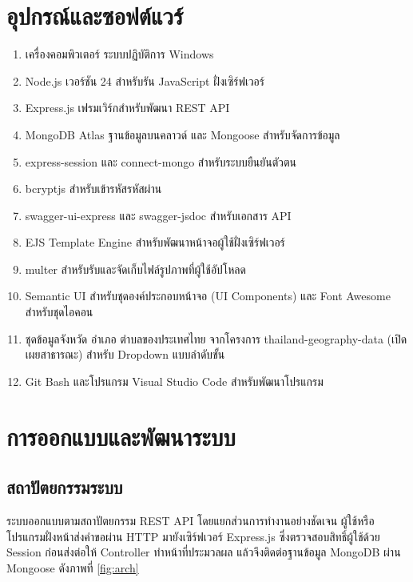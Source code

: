 \documentclass[12pt,a4paper]{report}
\begin{document}
\section{อุปกรณ์และซอฟต์แวร์}

\begin{enumerate}[label=\arabic*., leftmargin=2.5em, itemsep=0.2em]
  \item เครื่องคอมพิวเตอร์ ระบบปฏิบัติการ Windows
  \item Node.js เวอร์ชัน 24 สำหรับรัน JavaScript ฝั่งเซิร์ฟเวอร์
  \item Express.js เฟรมเวิร์กสำหรับพัฒนา REST API
  \item MongoDB Atlas ฐานข้อมูลบนคลาวด์ และ Mongoose สำหรับจัดการข้อมูล
  \item express-session และ connect-mongo สำหรับระบบยืนยันตัวตน
  \item bcryptjs สำหรับเข้ารหัสรหัสผ่าน
  \item swagger-ui-express และ swagger-jsdoc สำหรับเอกสาร API
  \item EJS Template Engine สำหรับพัฒนาหน้าจอผู้ใช้ฝั่งเซิร์ฟเวอร์
  \item multer สำหรับรับและจัดเก็บไฟล์รูปภาพที่ผู้ใช้อัปโหลด
  \item Semantic UI สำหรับชุดองค์ประกอบหน้าจอ (UI Components) และ Font Awesome สำหรับชุดไอคอน
  \item ชุดข้อมูลจังหวัด อำเภอ ตำบลของประเทศไทย จากโครงการ thailand-geography-data (เปิดเผยสาธารณะ) สำหรับ Dropdown แบบลำดับขั้น
  \item Git Bash และโปรแกรม Visual Studio Code สำหรับพัฒนาโปรแกรม
\end{enumerate}

\section{การออกแบบและพัฒนาระบบ}

\subsection{สถาปัตยกรรมระบบ}

ระบบออกแบบตามสถาปัตยกรรม REST API โดยแยกส่วนการทำงานอย่างชัดเจน ผู้ใช้หรือโปรแกรมฝั่งหน้าส่งคำขอผ่าน HTTP มายังเซิร์ฟเวอร์ Express.js ซึ่งตรวจสอบสิทธิ์ผู้ใช้ด้วย Session ก่อนส่งต่อให้ Controller ทำหน้าที่ประมวลผล แล้วจึงติดต่อฐานข้อมูล MongoDB ผ่าน Mongoose ดังภาพที่ \ref{fig:arch}
\end{document}
